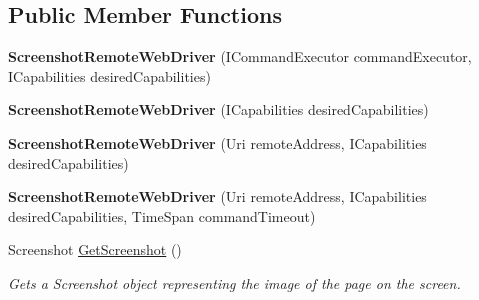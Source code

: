 \subsection*{Public Member Functions}
\begin{DoxyCompactItemize}
\item 
\hypertarget{class_proto_test_1_1_golem_1_1_web_driver_1_1_screenshot_remote_web_driver_a2eec84f0e39d385ed158be6df792784c}{{\bfseries Screenshot\-Remote\-Web\-Driver} (I\-Command\-Executor command\-Executor, I\-Capabilities desired\-Capabilities)}\label{class_proto_test_1_1_golem_1_1_web_driver_1_1_screenshot_remote_web_driver_a2eec84f0e39d385ed158be6df792784c}

\item 
\hypertarget{class_proto_test_1_1_golem_1_1_web_driver_1_1_screenshot_remote_web_driver_af8b218863d957c3d7875a8ed6d8933cf}{{\bfseries Screenshot\-Remote\-Web\-Driver} (I\-Capabilities desired\-Capabilities)}\label{class_proto_test_1_1_golem_1_1_web_driver_1_1_screenshot_remote_web_driver_af8b218863d957c3d7875a8ed6d8933cf}

\item 
\hypertarget{class_proto_test_1_1_golem_1_1_web_driver_1_1_screenshot_remote_web_driver_a3169c363b370935bc3aea33783226e82}{{\bfseries Screenshot\-Remote\-Web\-Driver} (Uri remote\-Address, I\-Capabilities desired\-Capabilities)}\label{class_proto_test_1_1_golem_1_1_web_driver_1_1_screenshot_remote_web_driver_a3169c363b370935bc3aea33783226e82}

\item 
\hypertarget{class_proto_test_1_1_golem_1_1_web_driver_1_1_screenshot_remote_web_driver_a8c401ea3b9371c5883be0a070fb2c176}{{\bfseries Screenshot\-Remote\-Web\-Driver} (Uri remote\-Address, I\-Capabilities desired\-Capabilities, Time\-Span command\-Timeout)}\label{class_proto_test_1_1_golem_1_1_web_driver_1_1_screenshot_remote_web_driver_a8c401ea3b9371c5883be0a070fb2c176}

\item 
Screenshot \hyperlink{class_proto_test_1_1_golem_1_1_web_driver_1_1_screenshot_remote_web_driver_a2c67b3a43ba743440a0323ceae10de33}{Get\-Screenshot} ()
\begin{DoxyCompactList}\small\item\em Gets a Screenshot object representing the image of the page on the screen. \end{DoxyCompactList}\end{DoxyCompactItemize}
